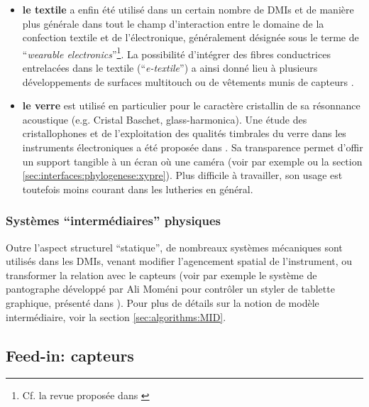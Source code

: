 \begin{itemize}[noitemsep]
	\item \textbf{le textile} a enfin été utilisé dans un certain nombre de \glspl{DMI} et de manière plus générale dans tout le champ d'interaction entre le domaine de la confection textile et de l'électronique, généralement désignée sous le terme de ``\textit{wearable electronics}''\footnote{Cf. la revue proposée dans \cite{stoppa_wearable_2014}}. La possibilité d'intégrer des fibres conductrices entrelacées dans le textile (``\textit{e-textile}'') a ainsi donné lieu à plusieurs développements de surfaces multitouch \cite{freed_application_2008, donneaud_designing_2017, wicaksono_fabrickeyboard:_2017} ou de vêtements munis de capteurs \cite{hayafuchi_musicglove_2008, serafin_controlling_2014, myllykoski_prototyping_2015}.
	\item \textbf{le verre} est utilisé en particulier pour le caractère cristallin de sa résonnance acoustique (e.g. Cristal Baschet, glass-harmonica). Une étude des cristallophones et de l'exploitation des qualités timbrales du verre dans les instruments électroniques a été proposée dans \cite{jensenius_evaluating_2010, frounberg_glass_2010}. Sa transparence permet d'offir un support tangible à un écran où une caméra (voir par exemple \cite{savary_dirti_2012} ou la section \ref{sec:interfaces:phylogenese:xypre}). Plus difficile à travailler, son usage est toutefois moins courant dans les lutheries en général.
\end{itemize}

\subsubsection{Systèmes ``intermédiaires'' physiques}

\noindent Outre l'aspect structurel ``statique'', de nombreaux systèmes mécaniques sont utilisés dans les \glspl{DMI}, venant modifier l'agencement spatial de l'instrument, ou transformer la relation avec le capteurs (voir par exemple le système de pantographe développé par Ali Moméni pour contrôler un styler de tablette graphique, présenté dans \cite{zbyszynski_ten_2007}). Pour plus de détails sur la notion de modèle intermédiaire, voir la section \ref{sec:algorithms:MID}.



\subsection{Feed-in: capteurs}

